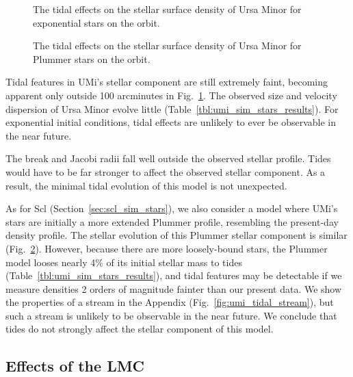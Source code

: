 \begin{figure}
\centering
{}
\caption[Ursa Minor simulated density profiles]{The tidal effects on the
stellar surface density of Ursa Minor for exponential stars on the
\smallperi{} orbit.}\label{fig:umi_smallperi_i_f}
\end{figure}

\begin{figure}
\centering
{}
\caption[Ursa Minor Plummer model density]{The tidal effects on the
stellar surface density of Ursa Minor for Plummer stars on the
\smallperi{} orbit.}\label{fig:umi_plummer_i_f}
\end{figure}

Tidal features in UMi's stellar component are still extremely faint,
becoming apparent only outside 100 arcminutes in
Fig.~\ref{fig:umi_smallperi_i_f}. The observed size and velocity
dispersion of Ursa Minor evolve little
(Table~\ref{tbl:umi_sim_stars_results}). For exponential initial
conditions, tidal effects are unlikely to ever be observable in the near
future.

The break and Jacobi radii fall well outside the observed stellar
profile. Tides would have to be far stronger to affect the observed
stellar component. As a result, the minimal tidal evolution of this
model is not unexpected.

As for Scl (Section~\ref{sec:scl_sim_stars}), we also consider a model
where UMi's stars are initially a more extended Plummer profile,
resembling the present-day density profile. The stellar evolution of
this Plummer stellar component is similar
(Fig.~\ref{fig:umi_plummer_i_f}). However, because there are more
loosely-bound stars, the Plummer model looses nearly 4\% of its initial
stellar mass to tides (Table~\ref{tbl:umi_sim_stars_results}), and tidal
features may be detectable if we measure densities 2 orders of magnitude
fainter than our present data. We show the properties of a stream in the
Appendix (Fig.~\ref{fig:umi_tidal_stream}), but such a stream is
unlikely to be observable in the near future. We conclude that tides do
not strongly affect the stellar component of this model.

\subsection{Effects of the LMC}\label{effects-of-the-lmc}

